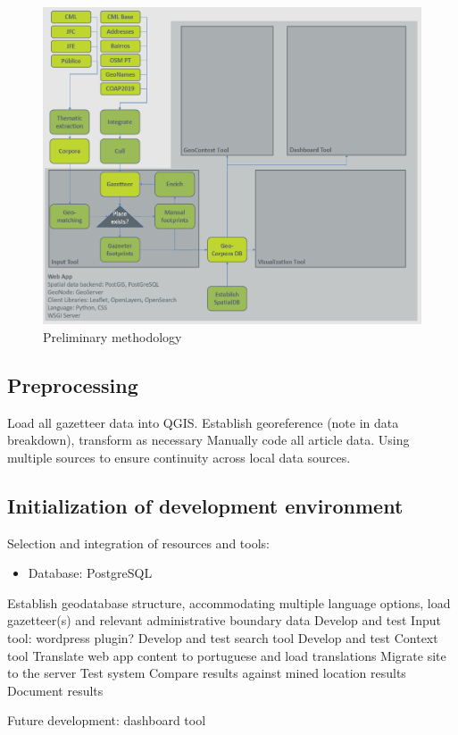 \begin{figure}[H]
	\centering
	\includegraphics[width=.9\linewidth]{images/method_model.png}
	\caption{Preliminary methodology}
	\label{fig:method_model}
\end{figure}

\subsection{Preprocessing}
Load all gazetteer data into QGIS.
Establish georeference (note in data breakdown), transform as necessary
Manually code all article data. Using multiple sources to ensure continuity across local data sources.

\subsection{Initialization of development environment}
Selection and integration of resources and tools:
\begin{itemize}
	\item Database: PostgreSQL
\end{itemize}
Establish geodatabase structure, accommodating multiple language options, load gazetteer(s) and relevant administrative boundary data
Develop and test Input tool: wordpress plugin?
Develop and test search tool
Develop and test Context tool
Translate web app content to portuguese and load translations
Migrate site to the server
Test system
Compare results against mined location results
Document results

Future development: dashboard tool

